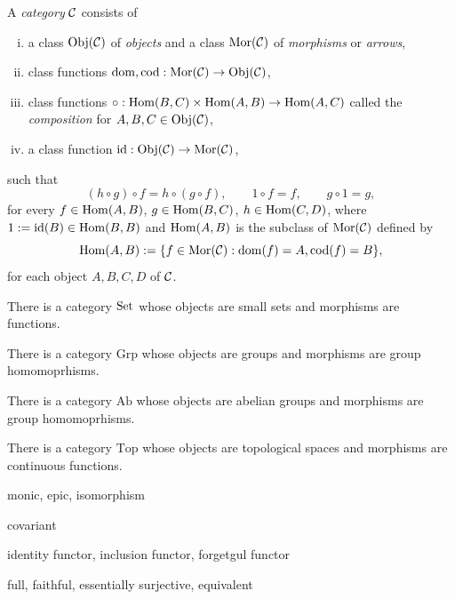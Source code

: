 \documentclass{../../large}
\begin{document}
\begin{prb}[Categories]
A \emph{category} $\mathcal{C}$ consists of
\begin{enumerate}[(i)]
\item a class $\operatorname{Obj}(\mathcal{C})$ of \emph{objects} and a class $\operatorname{Mor}(\mathcal{C})$ of \emph{morphisms} or \emph{arrows},
\item class functions $\operatorname{dom},\operatorname{cod}:\operatorname{Mor}(\mathcal{C})\to\operatorname{Obj}(\mathcal{C})$,
\item class functions $\circ:\operatorname{Hom}(B,C)\times\operatorname{Hom}(A,B)\to\operatorname{Hom}(A,C)$ called the \emph{composition} for $A,B,C\in\operatorname{Obj}(\mathcal{C})$,
\item a class function $\operatorname{id}:\operatorname{Obj}(\mathcal{C})\to\operatorname{Mor}(\mathcal{C})$,
\end{enumerate}
such that
\[(h\circ g)\circ f=h\circ(g\circ f),\qquad 1\circ f=f,\qquad g\circ1=g,\]
for every $f\in\operatorname{Hom}(A,B)$, $g\in\operatorname{Hom}(B,C)$, $h\in\operatorname{Hom}(C,D)$, where $1:=\operatorname{id}(B)\in\operatorname{Hom}(B,B)$ and $\operatorname{Hom}(A,B)$ is the subclass of $\operatorname{Mor}(\mathcal{C})$ defined by
\[\operatorname{Hom}(A,B):=\{f\in\operatorname{Mor}(\mathcal{C}):\operatorname{dom}(f)=A,\operatorname{cod}(f)=B\},\]
for each object $A,B,C,D$ of $\mathcal{C}$.
\begin{parts}
\item There is a category $\operatorname{Set}$ whose objects are small sets and morphisms are functions.
\item There is a category $\mathrm{Grp}$ whose objects are groups and morphisms are group homomoprhisms.
\item There is a category $\mathrm{Ab}$ whose objects are abelian groups and morphisms are group homomoprhisms.
\item There is a category $\mathrm{Top}$ whose objects are topological spaces and morphisms are continuous functions.
\end{parts}
\end{prb}


\begin{prb}
monic, epic, isomorphism


\end{prb}



\begin{prb}[Functors]

covariant



identity functor, inclusion functor, forgetgul functor
\end{prb}



\begin{prb}
full, faithful, essentially surjective, equivalent

\end{prb}
\end{document}
